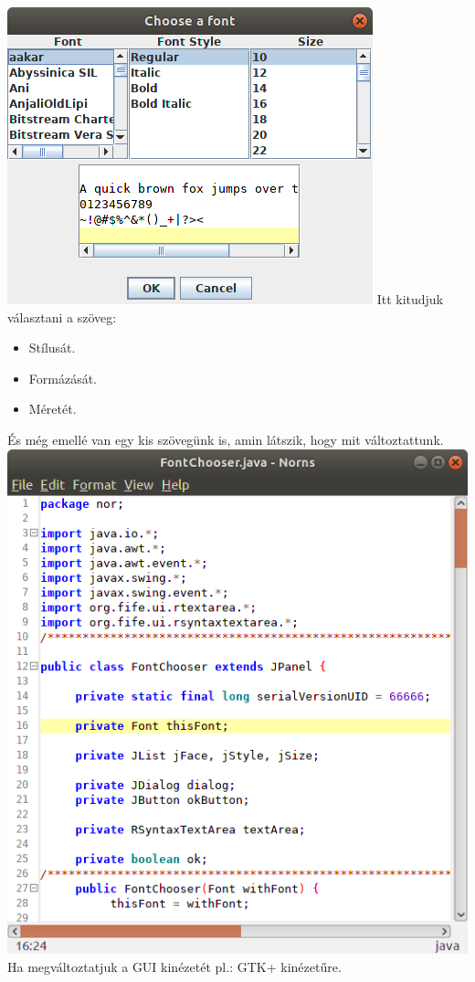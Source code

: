 \documentclass[12pt]{article}
\begin{document}
\includegraphics[width = \textwidth]{Font}
Itt kitudjuk választani a szöveg:
\begin{itemize}
  \item Stílusát.
  \item Formázását.
  \item Méretét.
\end{itemize}
És még emellé van egy kis szövegünk is, amin látszik, hogy mit változtattunk.\\

\includegraphics[width = \textwidth]{GTKLook}
Ha megváltoztatjuk a GUI kinézetét pl.: GTK+ kinézetűre. \\
\end{document}

